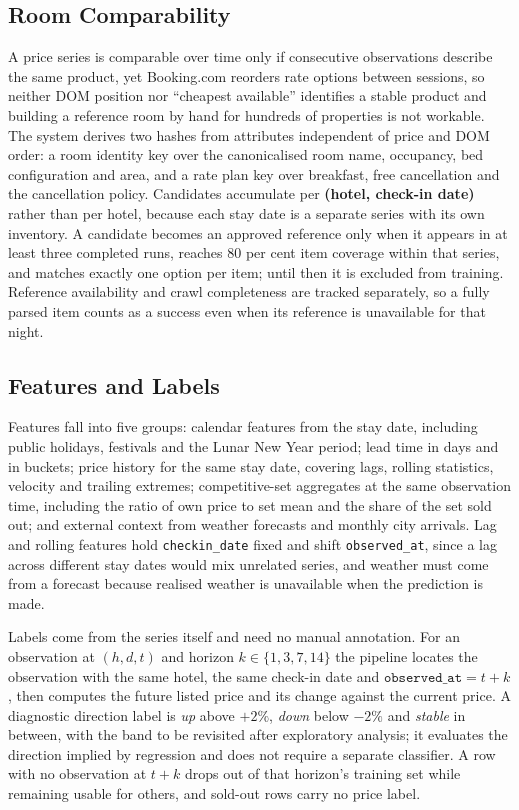 \subsection{Room Comparability}

A price series is comparable over time only if consecutive observations describe the same product, yet Booking.com reorders rate options between sessions, so neither DOM position nor ``cheapest available'' identifies a stable product and building a reference room by hand for hundreds of properties is not workable. The system derives two hashes from attributes independent of price and DOM order: a room identity key over the canonicalised room name, occupancy, bed configuration and area, and a rate plan key over breakfast, free cancellation and the cancellation policy. Candidates accumulate per \textbf{(hotel, check-in date)} rather than per hotel, because each stay date is a separate series with its own inventory. A candidate becomes an approved reference only when it appears in at least three completed runs, reaches 80 per cent item coverage within that series, and matches exactly one option per item; until then it is excluded from training. Reference availability and crawl completeness are tracked separately, so a fully parsed item counts as a success even when its reference is unavailable for that night.

\subsection{Features and Labels}

Features fall into five groups: calendar features from the stay date, including public holidays, festivals and the Lunar New Year period; lead time in days and in buckets; price history for the same stay date, covering lags, rolling statistics, velocity and trailing extremes; competitive-set aggregates at the same observation time, including the ratio of own price to set mean and the share of the set sold out; and external context from weather forecasts and monthly city arrivals. Lag and rolling features hold \texttt{checkin\_date} fixed and shift \texttt{observed\_at}, since a lag across different stay dates would mix unrelated series, and weather must come from a forecast because realised weather is unavailable when the prediction is made.

Labels come from the series itself and need no manual annotation. For an observation at $(h, d, t)$ and horizon $k \in \{1,3,7,14\}$ the pipeline locates the observation with the same hotel, the same check-in date and $\texttt{observed\_at} = t+k$, then computes the future listed price and its change against the current price. A diagnostic direction label is \emph{up} above $+2\%$, \emph{down} below $-2\%$ and \emph{stable} in between, with the band to be revisited after exploratory analysis; it evaluates the direction implied by regression and does not require a separate classifier. A row with no observation at $t+k$ drops out of that horizon's training set while remaining usable for others, and sold-out rows carry no price label.

